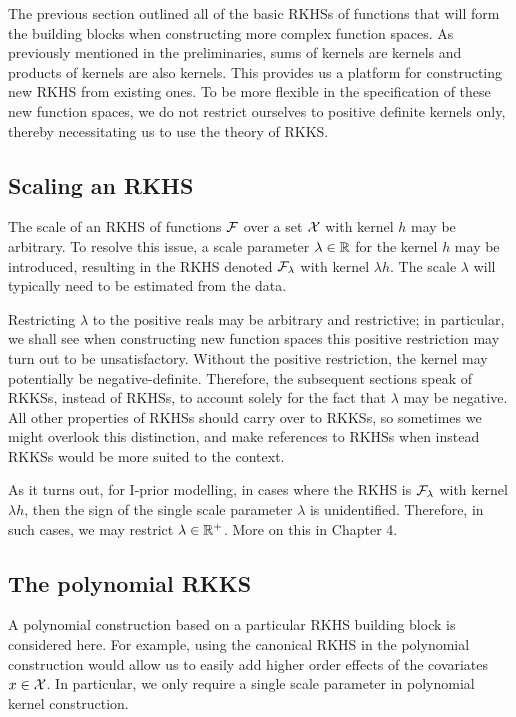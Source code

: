 
The previous section outlined all of the basic RKHSs of functions that will form the building blocks when constructing more complex function spaces.
As previously mentioned in the preliminaries, sums of kernels are kernels and products of kernels are also kernels. 
This provides us a platform for constructing new RKHS from existing ones.
To be more flexible in the specification of these new function spaces, we do not restrict ourselves to positive definite kernels only, thereby necessitating us to use the theory of RKKS.

\subsection{Scaling an RKHS}

The scale of an RKHS of functions ${\mathcal F}$ over a set ${\mathcal X}$ with kernel $h$ may be arbitrary.
To resolve this issue, a scale parameter $\lambda\in\mathbb{R}$ for the kernel $h$ may be introduced, resulting in the RKHS denoted ${\mathcal F}_\lambda$ with kernel $\lambda h$.
The scale $\lambda$ will typically need to be estimated from the data.

Restricting $\lambda$ to the positive reals may be arbitrary and restrictive; in particular, we shall see when constructing new function spaces this positive restriction may turn out to be unsatisfactory.
Without the positive restriction, the kernel may potentially be negative-definite.
Therefore, the subsequent sections speak of RKKSs, instead of RKHSs, to account solely for the fact that $\lambda$ may be negative.
All other properties of RKHSs should carry over to RKKSs, so sometimes we might overlook this distinction, and make references to RKHSs when instead RKKSs would be more suited to the context.
$\phantom{1}$
\begin{remark}
  As it turns out, for I-prior modelling, in cases where the RKHS is ${\mathcal F}_\lambda$ with kernel $\lambda h$, then the sign of the single scale parameter $\lambda$ is unidentified.
  Therefore, in such cases, we may restrict $\lambda\in\mathbb{R}^+$.
  More on this in Chapter 4.
\end{remark}

\subsection{The polynomial RKKS}

A polynomial construction based on a particular RKHS building block is considered here.
For example, using the canonical RKHS in the polynomial construction would allow us to easily add higher order effects of the covariates $x \in {\mathcal X}$.
In particular, we only require a single scale parameter in polynomial kernel construction.

